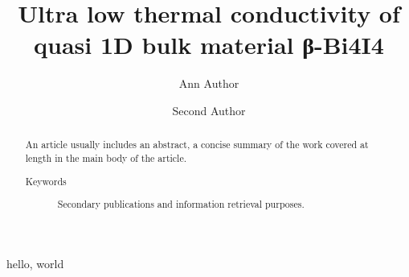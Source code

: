 \documentclass[%
 reprint,
 amsmath,amssymb,
 aps,
prb,
]{revtex4-1}
\begin{document}
\title{Ultra low thermal conductivity of quasi 1D bulk material β-Bi4I4}
\author{Ann Author}
\author{Second Author}%
%
\begin{abstract}
An article usually includes an abstract, a concise summary of the work
covered at length in the main body of the article. 
\begin{description}
\item[Keywords]
Secondary publications and information retrieval purposes.
\end{description}
\end{abstract}

\maketitle

hello, world %
\end{document}

